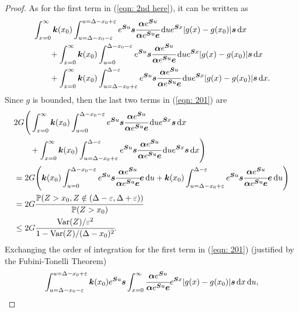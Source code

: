 \begin{proof}
 	As for the first term in (\ref{eqn: 2nd here}), it can be written as 
 	\begin{align}
 		&\int_{x=0}^\infty \boldsymbol k(x_0)\int_{u=\Delta-x_0-\varepsilon}^{u=\Delta-x_0+\varepsilon} e^{\boldsymbol Su}\boldsymbol s \cfrac{\boldsymbol \alpha e^{\boldsymbol Su}}{\boldsymbol \alpha e^{\boldsymbol Su}\boldsymbol e} \, \mathrm{d} u e^{\boldsymbol Sx}|g(x) - g(x_0)|\boldsymbol s\, \mathrm{d} x \nonumber
 		\\&\qquad{}+\int_{x=0}^\infty \boldsymbol k(x_0)\int_{u=0}^{\Delta-x_0-\varepsilon} e^{\boldsymbol Su}\boldsymbol s \cfrac{\boldsymbol \alpha e^{\boldsymbol Su}}{\boldsymbol \alpha e^{\boldsymbol Su}\boldsymbol e} \, \mathrm{d} u e^{\boldsymbol Sx}|g(x) - g(x_0)|\boldsymbol s\, \mathrm{d} x \nonumber
 		\\&\qquad{}+\int_{x=0}^\infty \boldsymbol k(x_0)\int_{u=\Delta-x_0+\varepsilon}^{\Delta-\varepsilon} e^{\boldsymbol Su}\boldsymbol s \cfrac{\boldsymbol \alpha e^{\boldsymbol Su}}{\boldsymbol \alpha e^{\boldsymbol Su}\boldsymbol e} \, \mathrm{d} u e^{\boldsymbol Sx}|g(x) - g(x_0)|\boldsymbol s\, \mathrm{d} x. \label{eqn: 201}
 	\end{align}
 	Since \(g\) is bounded, then the last two terms in (\ref{eqn: 201}) are 
 	\begin{align}
 		&2G\Bigg(\int_{x=0}^\infty \boldsymbol k(x_0)\int_{u=0}^{\Delta-x_0-\varepsilon} e^{\boldsymbol Su}\boldsymbol s \cfrac{\boldsymbol \alpha e^{\boldsymbol Su}}{\boldsymbol \alpha e^{\boldsymbol Su}\boldsymbol e} \, \mathrm{d} u e^{\boldsymbol Sx}\boldsymbol s\, \mathrm{d} x \nonumber
 		\\&\qquad{}+\int_{x=0}^\infty \boldsymbol k(x_0)\int_{u=\Delta-x_0+\varepsilon}^{\Delta-\varepsilon} e^{\boldsymbol Su}\boldsymbol s \cfrac{\boldsymbol \alpha e^{\boldsymbol Su}}{\boldsymbol \alpha e^{\boldsymbol Su}\boldsymbol e} \, \mathrm{d} u e^{\boldsymbol Sx}\boldsymbol s\, \mathrm{d} x\Bigg) \nonumber 
 		\\&=2G\Bigg(\boldsymbol k(x_0)\int_{u=0}^{\Delta-x_0-\varepsilon} e^{\boldsymbol Su}\boldsymbol s \cfrac{\boldsymbol \alpha e^{\boldsymbol Su}}{\boldsymbol \alpha e^{\boldsymbol Su}\boldsymbol e}  \boldsymbol e  \, \mathrm{d} u\nonumber
 		+ \boldsymbol k(x_0)\int_{u=\Delta-x_0+\varepsilon}^{\Delta-\varepsilon} e^{\boldsymbol Su}\boldsymbol s \cfrac{\boldsymbol \alpha e^{\boldsymbol Su}}{\boldsymbol \alpha e^{\boldsymbol Su}\boldsymbol e} \boldsymbol e\, \mathrm{d} u \Bigg) \nonumber
 		\\&=2G \cfrac{\mathbb P(Z>x_0, Z\notin(\Delta-\varepsilon, \Delta+\varepsilon))}{\mathbb P(Z>x_0)}  \nonumber 
 		\\&\leq 2G\cfrac{\mathrm{Var}(Z)/\varepsilon^2}{1-\mathrm{Var}(Z)/(\Delta-x_0)^2}.
 	\end{align}
 	Exchanging the order of integration for the first term in (\ref{eqn: 201}) (justified by the Fubini-Tonelli Theorem)
 	\begin{align}
 		\int_{u=\Delta-x_0-\varepsilon}^{u=\Delta-x_0+\varepsilon} \bs k(x_0) e^{\bs Su}\bs s\int_{x=0}^\infty \cfrac{\bs \alpha e^{\bs Su}}{\bs \alpha e^{\bs Su}\bs e} e^{\bs Sx}|g(x)-g(x_0)|\bs s\wrt x \wrt u, \label{eqn: fdk13897}

\end{align}
\end{proof}
